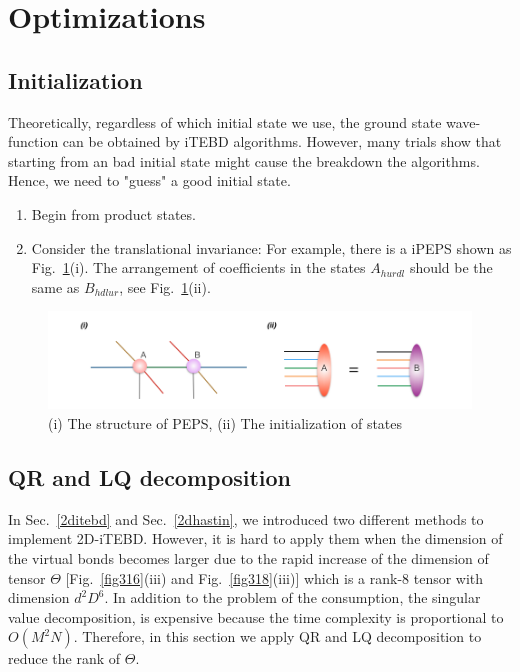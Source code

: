 \section{Optimizations}
\label{2dopt}

\subsection{Initialization}
\label{2doptInit}

Theoretically, regardless of which initial state we use, the ground state wave-function can be obtained by iTEBD algorithms. However, many trials show that starting from an bad initial state might cause the breakdown the algorithms. Hence, we need to "guess" a good initial state.

\begin{enumerate}
	\item Begin from product states.
	\item Consider the translational invariance: For example, there is a iPEPS shown as Fig.~\ref{fig321}(i). The arrangement of coefficients in the states $A_{hurdl}$ should be the same as $B_{hdlur}$, see Fig.~\ref{fig321}(ii).
\end{enumerate}

\begin{figure}[ht]
	\centering
	\includegraphics[width=1.00\textwidth]{figures/fig321.png}
	\caption[The diagrams of initializing projected entangled pair states]{(i) The structure of PEPS, (ii) The initialization of states}
	\label{fig321}
\end{figure}

\subsection{QR and LQ decomposition}
\label{2doptQR} 
In Sec.~\ref{2ditebd} and Sec.~\ref{2dhastin}, we introduced two different methods to implement 2D-iTEBD. However, it is hard to apply them when the dimension of the virtual bonds becomes larger due to the rapid increase of the dimension of tensor $\Theta$ [Fig.~\ref{fig316}(iii) and Fig.~\ref{fig318}(iii)] which is a rank-8 tensor with dimension $d^2D^6$. In addition to the problem of the consumption, the singular value decomposition, is expensive because the time complexity is proportional to $O(M^2N)$. Therefore, in this section we apply QR and LQ decomposition to reduce the rank of $\Theta$.

